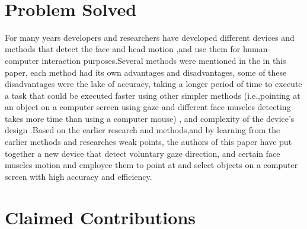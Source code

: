 \documentclass[a4paper]{article}
\begin{document}
\maketitle
{} \\

\section{Problem Solved}
For many years developers and researchers have developed different devices and methods that detect the face and head motion ,and use them for human-
computer interaction purposes.Several methods were mentioned in the in this paper, each method had its own advantages and disadvantages, some of these 
disadvantages were the lake of accuracy, taking a longer period of time to execute a task that could be executed faster using other simpler methods 
(i.e.,pointing at an object on a computer screen using gaze and different face muscles detecting takes more time than using a computer mouse) , and 
complexity of the device's design   .Based on the earlier research and methods,and by learning from the earlier methods and researches weak points, the 
authors of this paper have put together a new device that detect voluntary gaze direction, and certain face muscles motion and employee them to point at 
and select objects on a computer screen with high accuracy and efficiency.

\section{Claimed Contributions}
\end{document}
